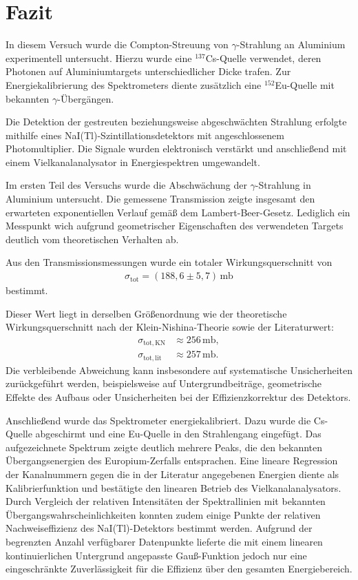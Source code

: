 \chapter{Fazit}
In diesem Versuch wurde die Compton-Streuung von $\gamma$-Strahlung an Aluminium experimentell untersucht. 
Hierzu wurde eine $^{137}$Cs-Quelle verwendet, deren Photonen auf Aluminiumtargets unterschiedlicher Dicke trafen. 
Zur Energiekalibrierung des Spektrometers diente zusätzlich eine $^{152}$Eu-Quelle mit bekannten $\gamma$-Übergängen.

Die Detektion der gestreuten beziehungsweise abgeschwächten Strahlung erfolgte mithilfe eines NaI(Tl)-Szintillationsdetektors mit angeschlossenem Photomultiplier. 
Die Signale wurden elektronisch verstärkt und anschließend mit einem Vielkanalanalysator in Energiespektren umgewandelt.

Im ersten Teil des Versuchs wurde die Abschwächung der $\gamma$-Strahlung in Aluminium untersucht. 
Die gemessene Transmission zeigte insgesamt den erwarteten exponentiellen Verlauf gemäß dem Lambert-Beer-Gesetz. 
Lediglich ein Messpunkt wich aufgrund geometrischer Eigenschaften des verwendeten Targets deutlich vom theoretischen Verhalten ab.

Aus den Transmissionsmessungen wurde ein totaler Wirkungsquerschnitt von
\begin{align}
    \sigma_\mathrm{tot}
    =
    (188,6 \pm 5,7)\,\mathrm{mb}
\end{align}
bestimmt.

Dieser Wert liegt in derselben Größenordnung wie der theoretische Wirkungsquerschnitt nach der Klein-Nishina-Theorie sowie der Literaturwert:
\begin{align}
    \sigma_{\mathrm{tot,KN}}
    &\approx
    256\,\mathrm{mb},
    \\
    \sigma_{\mathrm{tot,lit}}
    &\approx
    257\,\mathrm{mb}.
\end{align}
Die verbleibende Abweichung kann insbesondere auf systematische Unsicherheiten zurückgeführt werden, beispielsweise auf Untergrundbeiträge, geometrische Effekte des Aufbaus oder Unsicherheiten bei der Effizienzkorrektur des Detektors.

Anschließend wurde das Spektrometer energiekalibriert. 
Dazu wurde die Cs-Quelle abgeschirmt und eine Eu-Quelle in den Strahlengang eingefügt. 
Das aufgezeichnete Spektrum zeigte deutlich mehrere Peaks, die den bekannten Übergangsenergien des Europium-Zerfalls entsprachen.
Eine lineare Regression der Kanalnummern gegen die in der Literatur angegebenen Energien diente als Kalibrierfunktion und bestätigte den linearen Betrieb des Vielkanalanalysators. 
Durch Vergleich der relativen Intensitäten der Spektrallinien mit bekannten Übergangswahrscheinlichkeiten konnten zudem einige Punkte der relativen Nachweiseffizienz des NaI(Tl)-Detektors bestimmt werden. 
Aufgrund der begrenzten Anzahl verfügbarer Datenpunkte lieferte die mit einem linearen kontinuierlichen Untergrund angepasste Gauß-Funktion jedoch nur eine eingeschränkte Zuverlässigkeit für die Effizienz über den gesamten Energiebereich.

